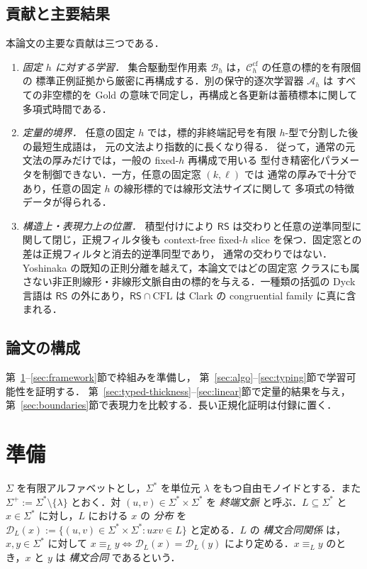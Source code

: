 \documentclass[11pt,a4paper]{ltjsarticle}
\theoremstyle{remark}
\theoremstyle{plain}
\newcommand{\D}{\mathcal{D}}
\newcommand{\cf}{\mathrm{cf}}
\newcommand{\Ccf}[1]{\mathcal C_{#1}^{\cf}}
\begin{document}
\subsection{貢献と主要結果}

本論文の主要な貢献は三つである．

\begin{enumerate}[label=\textup{(\arabic*)},leftmargin=2.4em]
\item \emph{固定 $h$ に対する学習．}
集合駆動型作用素 $\mathcal B_h$ は，$\Ccf{h}$ の任意の標的を有限個の
標準正例証拠から厳密に再構成する．別の保守的逐次学習器 $\mathcal A_h$ は
すべての非空標的を Gold の意味で同定し，再構成と各更新は蓄積標本に関して
多項式時間である．

\item \emph{定量的境界．}
任意の固定 $h$ では，標的非終端記号を有限 $h$-型で分割した後の最短生成語は，
元の文法より指数的に長くなり得る．
従って，通常の元文法の厚みだけでは，一般の fixed-$h$ 再構成で用いる
型付き精密化パラメータを制御できない．一方，任意の固定窓 $(k,\ell)$ では
通常の厚みで十分であり，任意の固定 $h$ の線形標的では線形文法サイズに関して
多項式の特徴データが得られる．

\item \emph{構造上・表現力上の位置．}
積型付けにより $\mathsf{RS}$ は交わりと任意の逆準同型に関して閉じ，正規フィルタ後も
context-free fixed-$h$ slice を保つ．固定窓との差は正規フィルタと消去的逆準同型であり，
通常の交わりではない．Yoshinaka の既知の正則分離を越えて，本論文ではどの固定窓
クラスにも属さない非正則線形・非線形文脈自由の標的を与える．一種類の括弧の Dyck
言語は $\mathsf{RS}$ の外にあり，$\mathsf{RS}\cap\mathrm{CFL}$ は Clark の
congruential family に真に含まれる．
\end{enumerate}

\subsection{論文の構成}
第~\ref{sec:prelim}--\ref{sec:framework}節で枠組みを準備し，
第~\ref{sec:algo}--\ref{sec:typing}節で学習可能性を証明する．
第~\ref{sec:typed-thickness}--\ref{sec:linear}節で定量的結果を与え，
第~\ref{sec:boundaries}節で表現力を比較する．長い正規化証明は付録に置く．

\section{準備}
\label{sec:prelim}

$\Sigma$ を有限アルファベットとし，$\Sigma^*$ を単位元 $\lambda$ をもつ自由モノイドとする．また $\Sigma^+:=\Sigma^*\setminus\{\lambda\}$ とおく．対 $(u,v)\in\Sigma^*\times\Sigma^*$ を \emph{終端文脈} と呼ぶ．$L\subseteq\Sigma^*$ と $x\in\Sigma^*$ に対し，$L$ における $x$ の \emph{分布} を
$\D_L(x):=\{(u,v)\in\Sigma^*\times\Sigma^*:uxv\in L\}$
と定める．$L$ の \emph{構文合同関係} は，$x,y\in\Sigma^*$ に対して $x\equiv_L y \Longleftrightarrow \D_L(x)=\D_L(y)$ により定める．$x\equiv_L y$ のとき，$x$ と $y$ は \emph{構文合同} であるという．
\end{document}
